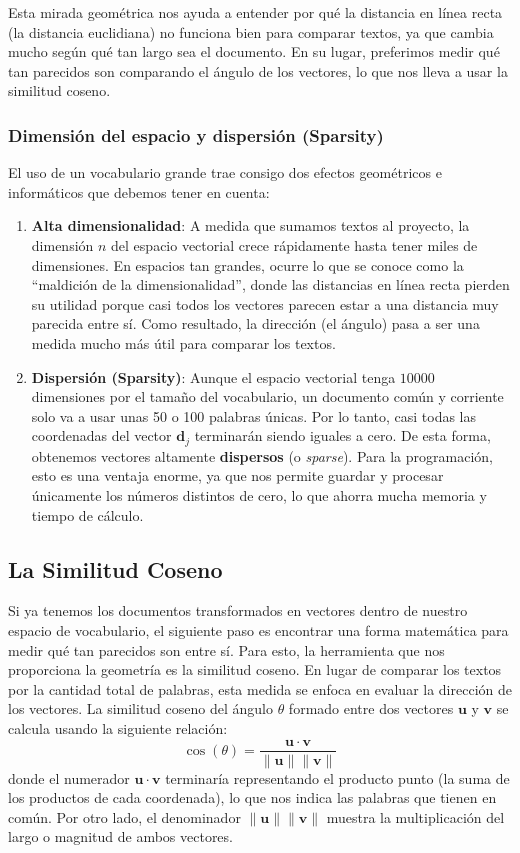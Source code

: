 \documentclass[12pt,a4paper]{article}
\begin{document}
Esta mirada geométrica nos ayuda a entender por qué la distancia en línea recta (la distancia euclidiana) no funciona bien para comparar textos, ya que cambia mucho según qué tan largo sea el documento. En su lugar, preferimos medir qué tan parecidos son comparando el ángulo de los vectores, lo que nos lleva a usar la similitud coseno.

\subsubsection{Dimensión del espacio y dispersión (Sparsity)}

El uso de un vocabulario grande trae consigo dos efectos geométricos e informáticos que debemos tener en cuenta:

\begin{enumerate}
    \item \textbf{Alta dimensionalidad}: A medida que sumamos textos al proyecto, la dimensión $n$ del espacio vectorial crece rápidamente hasta tener miles de dimensiones. En espacios tan grandes, ocurre lo que se conoce como la ``maldición de la dimensionalidad'', donde las distancias en línea recta pierden su utilidad porque casi todos los vectores parecen estar a una distancia muy parecida entre sí. Como resultado, la dirección (el ángulo) pasa a ser una medida mucho más útil para comparar los textos.
    
    \item \textbf{Dispersión (Sparsity)}: Aunque el espacio vectorial tenga $10000$ dimensiones por el tamaño del vocabulario, un documento común y corriente solo va a usar unas 50 o 100 palabras únicas. Por lo tanto, casi todas las coordenadas del vector $\mathbf{d}_j$ terminarán siendo iguales a cero. De esta forma, obtenemos vectores altamente \textbf{dispersos} (o \emph{sparse}). Para la programación, esto es una ventaja enorme, ya que nos permite guardar y procesar únicamente los números distintos de cero, lo que ahorra mucha memoria y tiempo de cálculo.
\end{enumerate}

\subsection{La Similitud Coseno}

Si ya tenemos los documentos transformados en vectores dentro de nuestro espacio de vocabulario, el siguiente paso es encontrar una forma matemática para medir qué tan parecidos son entre sí. Para esto, la herramienta que nos proporciona la geometría es la similitud coseno. En lugar de comparar los textos por la cantidad total de palabras, esta medida se enfoca en evaluar la dirección de los vectores. La similitud coseno del ángulo $\theta$ formado entre dos vectores $\mathbf{u}$ y $\mathbf{v}$ se calcula usando la siguiente relación:
\[
\cos(\theta) = \frac{\mathbf{u} \cdot \mathbf{v}}{\|\mathbf{u}\| \|\mathbf{v}\|}
\]
donde el numerador $\mathbf{u} \cdot \mathbf{v}$ terminaría representando el producto punto (la suma de los productos de cada coordenada), lo que nos indica las palabras que tienen en común. Por otro lado, el denominador $\|\mathbf{u}\| \|\mathbf{v}\|$ muestra la multiplicación del largo o magnitud de ambos vectores.
\end{document}
